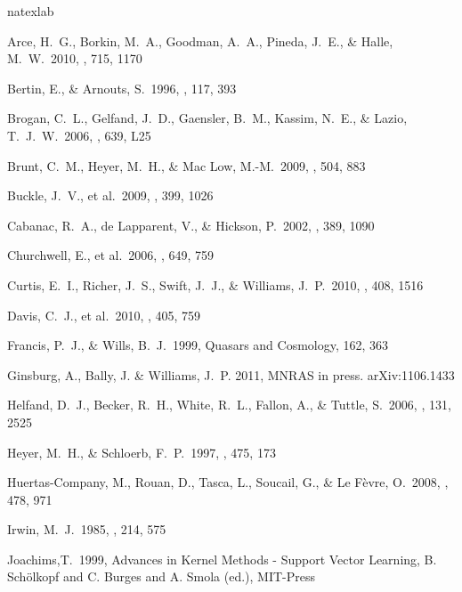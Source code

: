  \begin{thebibliography}{32}
\expandafter\ifx\csname natexlab\endcsname\relax\def\natexlab#1{#1}\fi

 Arce, H.~G., Borkin,
M.~A., Goodman, A.~A., Pineda, J.~E.,
\& Halle, M.~W.\ 2010, \apj, 715, 1170

 Bertin, E., \& Arnouts, S.\ 1996, \aaps, 117, 393

 Brogan, C.~L., Gelfand, J.~D., Gaensler, B.~M., Kassim, N.~E.,
\& Lazio, T.~J.~W.\ 2006, \apjl, 639, L25

 Brunt, C.~M., Heyer, M.~H., \& Mac Low, M.-M.\ 2009, \aap, 504, 883

 Buckle, J.~V., et al.\
2009, \mnras, 399, 1026

 Cabanac, R.~A., de Lapparent, V., \& Hickson, P.\ 2002, \aap, 389, 1090

 Churchwell, E., et
al.\ 2006, \apj, 649, 759


 Curtis, E.~I., Richer,
J.~S., Swift, J.~J., \& Williams, J.~P.\ 2010, \mnras, 408, 1516

 Davis, C.~J., et al.\
2010, \mnras, 405, 759

 Francis, P.~J., \& Wills, B.~J.\ 1999, Quasars and Cosmology, 162, 363

\bibitem[Ginsburg et al.(2011)]{Ginsburg11} Ginsburg, A., Bally, J. \& Williams, J.~P. 2011, MNRAS in press. arXiv:1106.1433

\bibitem[Helfand et al.(2006)]{Helfand06} Helfand, D.~J., Becker,
R.~H., White, R.~L., Fallon, A., \& Tuttle, S.\ 2006, \aj, 131, 2525


 Heyer, M.~H., \& Schloerb, F.~P.\ 1997, \apj, 475, 173

 Huertas-Company, M., Rouan, D., Tasca, L., Soucail, G., \& Le F{\`e}vre, O.\ 2008, \aap, 478, 971

\bibitem[Irwin(1985)]{Irwin85} Irwin, M.~J.\ 1985, \mnras, 214,
575


 Joachims,T.\ 1999, Advances in Kernel Methods - Support Vector Learning, B. Sch\"{o}lkopf and C. Burges and A. Smola (ed.), MIT-Press


\end{thebibliography}
